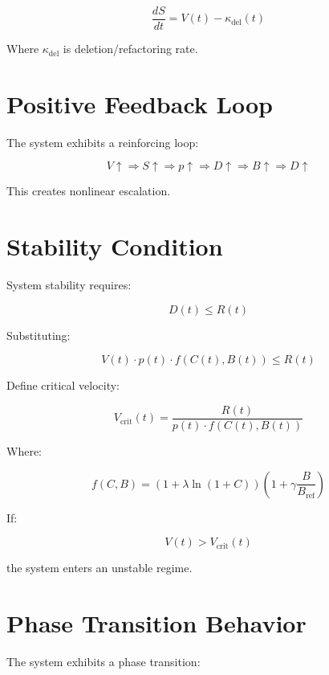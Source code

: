 \documentclass[11pt]{article}
\begin{document}
\begin{equation}
\frac{dS}{dt} = V(t) - \kappa_{\text{del}}(t)
\end{equation}

Where $\kappa_{\text{del}}$ is deletion/refactoring rate.

\section{Positive Feedback Loop}

The system exhibits a reinforcing loop:

\[
V \uparrow \Rightarrow S \uparrow \Rightarrow p \uparrow \Rightarrow D \uparrow \Rightarrow B \uparrow \Rightarrow D \uparrow
\]

This creates nonlinear escalation.

\section{Stability Condition}

System stability requires:

\begin{equation}
D(t) \leq R(t)
\end{equation}

Substituting:

\begin{equation}
V(t) \cdot p(t) \cdot f(C(t), B(t)) \leq R(t)
\end{equation}

Define critical velocity:

\begin{equation}
V_{\text{crit}}(t) = \frac{R(t)}{p(t) \cdot f(C(t), B(t))}
\end{equation}

Where:

\[
f(C, B) = \left(1 + \lambda \ln(1 + C)\right)\left(1 + \gamma \frac{B}{B_{\text{ref}}}\right)
\]

If:

\begin{equation}
V(t) > V_{\text{crit}}(t)
\end{equation}

the system enters an unstable regime.

\section{Phase Transition Behavior}

The system exhibits a phase transition:
\end{document}
